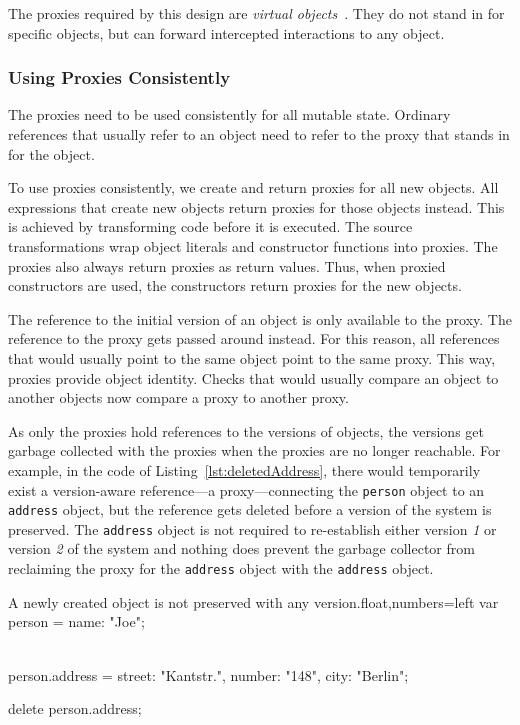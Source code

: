 The proxies required by this design are \emph{virtual objects}~\cite{VanCutsem2010PDP}.
They do not stand in for specific objects, but can forward intercepted interactions to any object.


\subsubsection{Using Proxies Consistently}

The proxies need to be used consistently for all mutable state.
Ordinary references that usually refer to an object need to refer to the proxy that stands in for the object.

To use proxies consistently, we create and return proxies for all new objects.
All expressions that create new objects return proxies for those objects instead.
This is achieved by transforming code before it is executed.
The source transformations wrap object literals and constructor functions into proxies.
The proxies also always return proxies as return values.
Thus, when proxied constructors are used, the constructors return proxies for the new objects.

The reference to the initial version of an object is only available to the proxy.
The reference to the proxy gets passed around instead.
For this reason, all references that would usually point to the same object point to the same proxy.
This way, proxies provide object identity.
Checks that would usually compare an object to another objects now compare a proxy to another proxy.

As only the proxies hold references to the versions of objects, the versions get garbage collected with the proxies when the proxies are no longer reachable.
For example, in the code of Listing~\ref{lst:deletedAddress}, there would temporarily exist a version-aware reference---a proxy---connecting the \lstinline{person} object to an \lstinline{address} object, but the reference gets deleted before a version of the system is preserved.
The \lstinline{address} object is not required to re-establish either version \emph{1} or version \emph{2} of the system and nothing does prevent the garbage collector from reclaiming the proxy for the \lstinline{address} object with the \lstinline{address} object.

\begin{code}{A newly created object is not preserved with any version.}{float,numbers=left}
    var person = {name: "Joe"};
    
    \\ [preserve first version]
    
    person.address = {street: "Kantstr.",
                      number: "148",
                      city: "Berlin"};
    
    delete person.address;
    
    \\ [preserve second version]
\end{code}
\iffalse
\end{verbatim}\fi


